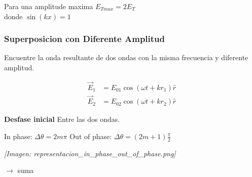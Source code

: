 \documentclass[12pt]{article}
\begin{document}
	Para una amplitude maxima $E_{Tmax} = 2E_T$\\
	donde $\sin(kx) = 1$
	
	\subsubsection*{Superposicion con Diferente Amplitud}
	Encuentre la onda resultante de dos ondas con la misma frecuencia y diferente amplitud.
	
	\begin{minipage}{0.4\textwidth}
		\begin{align*}
			\vec{E}_1 &= E_{01}\cos(\omega t + kr_1)\hat{r} \\
			\vec{E}_2 &= E_{02}\cos(\omega t + kr_2)\hat{r}
		\end{align*}
	\end{minipage}
	\begin{minipage}{0.5\textwidth}
		 \textbf{Desfase inicial} Entre las dos ondas.
	\end{minipage}
	
	\vspace{0.5cm}
	In phase: $\Delta\theta = 2m\pi$ \qquad \qquad Out of phase: $\Delta\theta = (2m+1)\frac{\pi}{2}$
	
	\textit{[Imagen: representacion\_in\_phase\_out\_of\_phase.png]}
	
	\vspace{0.5cm}
	$\rightarrow$ suma
	\begin{center}
	\end{center}
	
\end{document}
